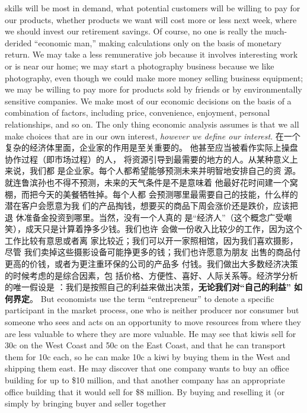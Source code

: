 \begin{paracol}{2}
skills will be most in demand, what potential customers will be
willing to pay for our products, whether products we want will cost more or less next week, where we should invest our retirement savings. Of course, no one is really the much-derided
``economic man,'' making calculations only on the basis of monetary return. We may take a less remunerative job because it involves interesting work or is near our home; we may start a
photography business because we like photography, even
though we could make more money selling business equipment; we may be willing to pay more for products sold by
friends or by environmentally sensitive companies. We make
most of our economic decisions on the basis of a combination of
factors, including price, convenience, enjoyment, personal relationships, and so on. The only thing economic analysis assumes
is that we all make choices that are in our own interest, \textit{however we define our interest}.
\switchcolumn
在一个复杂的经济体里面，企业家的作用是至关重要的。
他甚至应当被看作实际上操盘协作过程（即市场过程）的人，
将资源引导到最需要的地方的人。从某种意义上来说，我们都
是企业家。每个人都希望能够预测未来并明智地安排自己的资
源。就连鲁滨孙也不得不预测，未来的天气条件是不是意味着
他最好花时间建一个窝棚，而把今天的美餐牺牲掉。每个人都
会预测哪里最需要自己的技能，什么样的潜在客户会愿意为我
们的产品掏钱，想要买的商品下周会涨价还是跌价，应该把退
休准备金投资到哪里。当然，没有一个人真的 是“经济人”（这个概念广受嘲笑），成天只是计算着挣多少钱。我们也许
会做一份收入比较少的工作，因为这个工作比较有意思或者离
家比较近；我们可以开一家照相馆，因为我们喜欢摄影，尽管
我们卖掉这些摄影设备可能挣更多的钱；我们也许愿意为朋友
出售的商品付更高的价钱，或者为更注重环保的公司的产品多
付钱。我们做出大多数经济决策的时候考虑的是综合因素，包
括价格、方便性、喜好、人际关系等。经济学分析的唯一假设是 ：我们是按照自己的利益来做出决策，\textbf{无论我们对“自己的利益” 如何界定}。
\switchcolumn*
But economists use the term ``entrepreneur'' to denote a specific participant in the market process, one who is neither producer nor consumer but someone who sees and acts on an
opportunity to move resources from where they are less valuable to where they are more valuable. He may see that kiwis sell
for 30c on the West Coast and 50c on the East Coast, and that
he can transport them for 10c each, so he can make 10c a kiwi
by buying them in the West and shipping them east. He may
discover that one company wants to buy an office building for
up to \$10 million, and that another company has an appropriate office building that it would sell for \$8 million. By buying
and reselling it (or simply by bringing buyer and seller together

\end{paracol}
